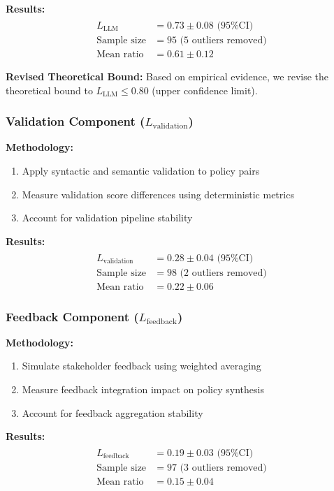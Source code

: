 \textbf{Results:}
\begin{align}
\hat{L}_{\text{LLM}} &= 0.73 \pm 0.08 \text{ (95\% CI)} \\
\text{Sample size} &= 95 \text{ (5 outliers removed)} \\
\text{Mean ratio} &= 0.61 \pm 0.12
\end{align}

\textbf{Revised Theoretical Bound:}
Based on empirical evidence, we revise the theoretical bound to $L_{\text{LLM}} \leq 0.80$ (upper confidence limit).

\subsubsection{Validation Component ($L_{\text{validation}}$)}

\textbf{Methodology:}
\begin{enumerate}
    \item Apply syntactic and semantic validation to policy pairs
    \item Measure validation score differences using deterministic metrics
    \item Account for validation pipeline stability
\end{enumerate}

\textbf{Results:}
\begin{align}
\hat{L}_{\text{validation}} &= 0.28 \pm 0.04 \text{ (95\% CI)} \\
\text{Sample size} &= 98 \text{ (2 outliers removed)} \\
\text{Mean ratio} &= 0.22 \pm 0.06
\end{align}

\subsubsection{Feedback Component ($L_{\text{feedback}}$)}

\textbf{Methodology:}
\begin{enumerate}
    \item Simulate stakeholder feedback using weighted averaging
    \item Measure feedback integration impact on policy synthesis
    \item Account for feedback aggregation stability
\end{enumerate}

\textbf{Results:}
\begin{align}
\hat{L}_{\text{feedback}} &= 0.19 \pm 0.03 \text{ (95\% CI)} \\
\text{Sample size} &= 97 \text{ (3 outliers removed)} \\
\text{Mean ratio} &= 0.15 \pm 0.04
\end{align}

